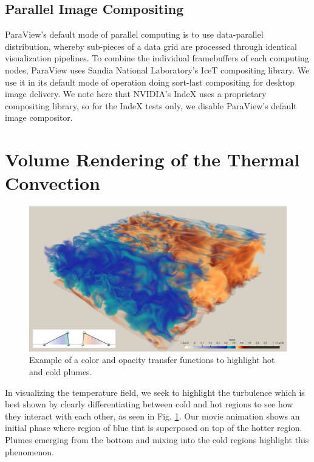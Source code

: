 \documentclass[final,5p,times,twocolumn]{elsarticle}
\begin{document}
\subsection{Parallel Image Compositing}

ParaView's default mode of parallel computing is to use data-parallel distribution,
whereby sub-pieces of a data grid are processed through identical visualization
pipelines. To combine the individual framebuffers of each computing nodes,
ParaView uses Sandia National Laboratory's IceT \cite{Moreland2011} compositing
library. We use it in its default mode of operation doing sort-last compositing
for desktop image delivery. We note here that NVIDIA's IndeX uses a proprietary
compositing library, so for the IndeX tests only, we disable ParaView's default
image compositor.

\section{Volume Rendering of the Thermal Convection}

\begin{figure}[!hbt]
	\centering
	\includegraphics[width=\linewidth]{zoom0000.pdf}%
	\caption{\label{fig:zoom} Example of a color and opacity transfer functions to highlight hot and cold plumes.}
\end{figure}


In visualizing the temperature field, we seek to highlight the turbulence which
is best shown by clearly differentiating between cold and hot regions to see how
they interact with each other, as seen in Fig. \ref{fig:zoom}. Our movie animation shows an initial phase where
region of blue tint is superposed on top of the hotter region. Plumes emerging
from the bottom and mixing into the cold regions highlight this phenomenon.
\end{document}
